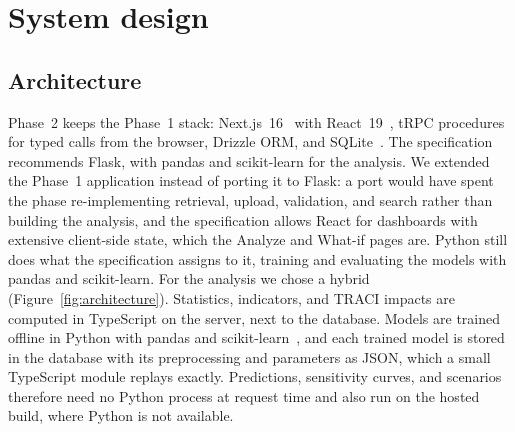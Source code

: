 \documentclass[11pt,a4paper]{article}
\begin{document}
\section{System design}
\label{sec:design}

\subsection{Architecture}

Phase~2 keeps the Phase~1 stack: Next.js~16~\cite{nextjs} with React~19~\cite{react}, tRPC
procedures for typed calls from the browser, Drizzle ORM, and SQLite~\cite{gaffney2022sqlite}.
The specification recommends Flask, with pandas and
scikit-learn for the analysis. We extended the Phase~1 application instead of porting it to Flask: a port
would have spent the phase re-implementing retrieval, upload, validation, and search rather than
building the analysis, and the specification allows React for dashboards with extensive
client-side state, which the Analyze and What-if pages are. Python still does what the
specification assigns to it, training and evaluating the models with pandas and scikit-learn.
For the analysis we chose a hybrid (Figure~\ref{fig:architecture}).
Statistics, indicators, and TRACI impacts are computed in TypeScript on the server, next to the
database. Models are trained offline in Python with pandas and
scikit-learn~\cite{pedregosa2011sklearn}, and each trained model is stored in the database with
its preprocessing and parameters as JSON, which a small TypeScript module replays exactly.
Predictions, sensitivity curves, and scenarios therefore need no Python process at request time
and also run on the hosted build, where Python is not available.
\end{document}
